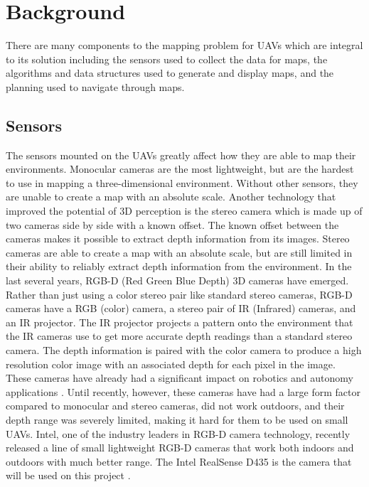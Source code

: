 \documentclass[12pt, letterpaper]{article}
\begin{document}
\section{Background}

There are many components to the mapping problem for UAVs which are integral to its solution including the sensors used to collect the data for maps, the algorithms and data structures used to generate and display maps, and the planning used to navigate through maps.

\subsection{Sensors} 
The sensors mounted on the UAVs greatly affect how they are able to map their environments. Monocular cameras are the most lightweight, but are the hardest to use in mapping a three-dimensional environment. Without other sensors, they are unable to create a map with an absolute scale. Another technology that improved the potential of 3D perception is the stereo camera which is made up of two cameras side by side with a known offset. The known offset between the cameras makes it possible to extract depth information from its images. Stereo cameras are able to create a map with an absolute scale, but are still limited in their ability to reliably extract depth information from the environment. In the last several years, RGB-D (Red Green Blue Depth) 3D cameras have emerged. Rather than just using a color stereo pair like standard stereo cameras, RGB-D cameras have a RGB (color) camera, a stereo pair of IR (Infrared) cameras, and an IR projector. The IR projector projects a pattern onto the environment that the IR cameras use to get more accurate depth readings than a standard stereo camera. The depth information is paired with the color camera to produce a high resolution color image with an associated depth for each pixel in the image.  These cameras have already had a significant impact on robotics and autonomy applications \cite{Henry2010}. Until recently, however, these cameras have had a large form factor compared to monocular and stereo cameras, did not work outdoors, and their depth range was severely limited, making it hard for them to be used on small UAVs. Intel, one of the industry leaders in RGB-D camera technology, recently released a line of small lightweight RGB-D cameras that work both indoors and outdoors with much better range. The Intel RealSense D435 is the camera that will be used on this project \cite{Intel}.
\end{document}
